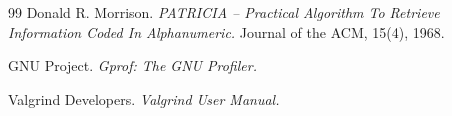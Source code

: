 \begin{thebibliography}{99}
Donald R. Morrison.
{\itshape PATRICIA -- Practical Algorithm To Retrieve Information Coded In Alphanumeric.}
Journal of the ACM, 15(4), 1968.

GNU Project.
{\itshape Gprof: The GNU Profiler.}

Valgrind Developers.
{\itshape Valgrind User Manual.}
\end{thebibliography}
\pagebreak
